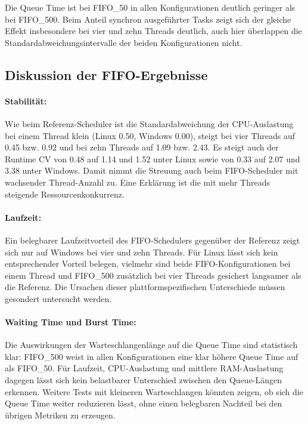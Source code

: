 \begin{sloppypar}
\noindent Die Queue Time ist bei \acs{FIFO}\_50 in allen Konfigurationen deutlich geringer als bei \acs{FIFO}\_500. Beim Anteil synchron ausgeführter Tasks zeigt sich der gleiche Effekt insbesondere bei vier und zehn Threads deutlich, auch hier überlappen die Standardabweichungsintervalle der beiden Konfigurationen nicht.

\subsection{Diskussion der \acs{FIFO}-Ergebnisse}
\paragraph{Stabilität:}
Wie beim Referenz-Scheduler ist die Standardabweichung der \acs{CPU}-Auslastung bei einem Thread klein (Linux 0.50, Windows 0.00), steigt bei vier Threads auf 0.45 bzw. 0.92 und bei zehn Threads auf 1.09 bzw. 2.43. Es steigt auch der Runtime \acs{CV} von 0.48 auf 1.14 und 1.52 unter Linux sowie von 0.33 auf 2.07 und 3.38 unter Windows. Damit nimmt die Streuung auch beim \acs{FIFO}-Scheduler mit wachsender Thread-Anzahl zu. Eine Erklärung ist die mit mehr Threads steigende Ressourcenkonkurrenz.

\paragraph{Laufzeit:}
Ein belegbarer Laufzeitvorteil des \acs{FIFO}-Schedulers gegenüber der Referenz zeigt sich nur auf Windows bei vier und zehn Threads. Für Linux lässt sich kein entsprechender Vorteil belegen, vielmehr sind beide \acs{FIFO}-Konfigurationen bei einem Thread und \acs{FIFO}\_500 zusätzlich bei vier Threads gesichert langsamer als die Referenz. Die Ursachen dieser plattformspezifischen Unterschiede müssen gesondert untersucht werden.

\paragraph{Waiting Time und Burst Time:}
Die Auswirkungen der Warteschlangenlänge auf die Queue Time sind statistisch klar: \acs{FIFO}\_500 weist in allen Konfigurationen eine klar höhere Queue Time auf als \acs{FIFO}\_50. Für Laufzeit, \acs{CPU}-Auslastung und mittlere \acs{RAM}-Auslastung dagegen lässt sich kein belastbarer Unterschied zwischen den Queue-Längen erkennen. Weitere Tests mit kleineren Warteschlangen könnten zeigen, ob sich die Queue Time weiter reduzieren lässt, ohne einen belegbaren Nachteil bei den übrigen Metriken zu erzeugen.


\end{sloppypar}
